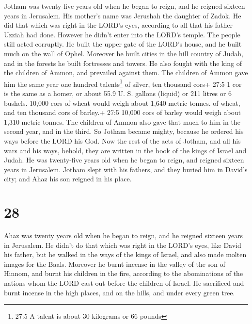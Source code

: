  Jotham was twenty-five years old when he began to reign,
and he reigned sixteen years in Jerusalem. His mother's name was
Jerushah the daughter of Zadok.  He did that which was right
in the LORD's eyes, according to all that his father Uzziah had done.
However he didn't enter into the LORD's temple. The people still acted
corruptly.  He built the upper gate of the LORD's house, and
he built much on the wall of Ophel.  Moreover he built
cities in the hill country of Judah, and in the forests he built
fortresses and towers.  He also fought with the king of the
children of Ammon, and prevailed against them. The children of Ammon
gave him the same year one hundred talents\footnote{27:5 A talent is
  about 30 kilograms or 66 pounds} of silver, ten thousand cors+ 27:5 1
cor is the same as a homer, or about 55.9 U. S. gallons (liquid) or 211
litres or 6 bushels. 10,000 cors of wheat would weigh about 1,640 metric
tonnes. of wheat, and ten thousand cors of barley.+ 27:5 10,000 cors of
barley would weigh about 1,310 metric tonnes. The children of Ammon also
gave that much to him in the second year, and in the third. 
So Jotham became mighty, because he ordered his ways before the LORD his
God.  Now the rest of the acts of Jotham, and all his wars
and his ways, behold, they are written in the book of the kings of
Israel and Judah.  He was twenty-five years old when he
began to reign, and reigned sixteen years in Jerusalem. 
Jotham slept with his fathers, and they buried him in David's city; and
Ahaz his son reigned in his place.

\hypertarget{section-27}{%
\section{28}\label{section-27}}

 Ahaz was twenty years old when he began to reign, and he
reigned sixteen years in Jerusalem. He didn't do that which was right in
the LORD's eyes, like David his father,  but he walked in
the ways of the kings of Israel, and also made molten images for the
Baals.  Moreover he burnt incense in the valley of the son
of Hinnom, and burnt his children in the fire, according to the
abominations of the nations whom the LORD cast out before the children
of Israel.  He sacrificed and burnt incense in the high
places, and on the hills, and under every green tree.

